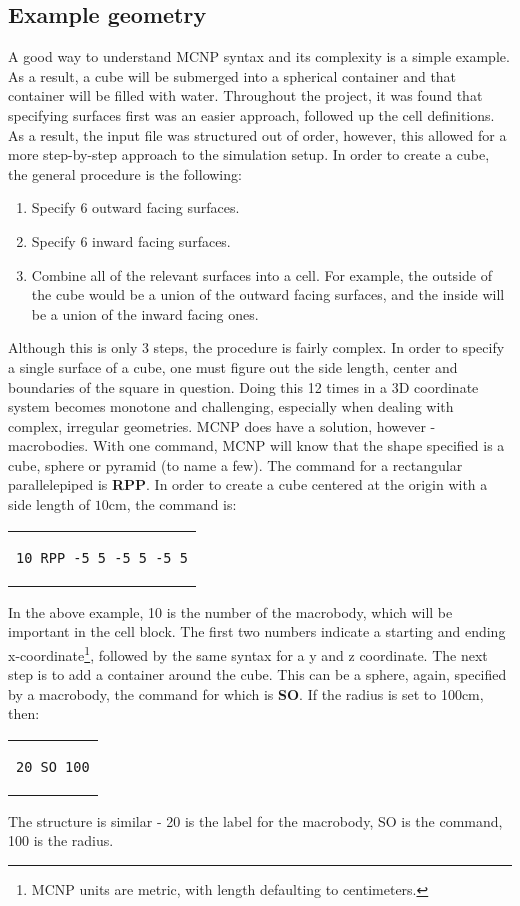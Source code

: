 \subsection{Example geometry}
A good way to understand MCNP syntax and its complexity is a simple example. As a result, a cube will be submerged into a spherical container and that container will be filled with water. Throughout the project, it was found that specifying surfaces first was an easier approach, followed up the cell definitions. As a result, the input file was structured out of order, however, this allowed for a more step-by-step approach to the simulation setup. In order to create a cube, the general procedure is the following:
\begin{enumerate}
	\item Specify 6 outward facing surfaces.
	\item Specify 6 inward facing surfaces.
	\item Combine all of the relevant surfaces into a cell. For example, the outside of the cube would be a union of the outward facing surfaces, and the inside will be a union of the inward facing ones.
\end{enumerate}
Although this is only 3 steps, the procedure is fairly complex. In order to specify a single surface of a cube, one must figure out the side length, center and boundaries of the square in question. Doing this 12 times in a 3D coordinate system becomes monotone and challenging, especially when dealing with complex, irregular geometries. MCNP does have a solution, however - macrobodies. With one command, MCNP will know that the shape specified is a cube, sphere or pyramid (to name a few). The command for a rectangular parallelepiped is \textbf{RPP}. In order to create a cube centered at the origin with a side length of $10$cm, the command is:
\begin{center}
\begin{tabular}{c}
\begin{lstlisting}
10 RPP -5 5 -5 5 -5 5
\end{lstlisting}
\end{tabular}
\end{center}
In the above example, 10 is the number of the macrobody, which will be important in the cell block. The first two numbers indicate a starting and ending x-coordinate\footnote{MCNP units are metric, with length defaulting to centimeters.}, followed by the same syntax for a y and z coordinate. The next step is to add a container around the cube. This can be a sphere, again, specified by a macrobody, the command for which is \textbf{SO}. If the radius is set to 100cm, then:
\begin{center}
\begin{tabular}{c}
\begin{lstlisting}
20 SO 100
\end{lstlisting}
\end{tabular}
\end{center}
The structure is similar - 20 is the label for the macrobody, SO is the command, 100 is the radius.
\label{sec:simulations}
